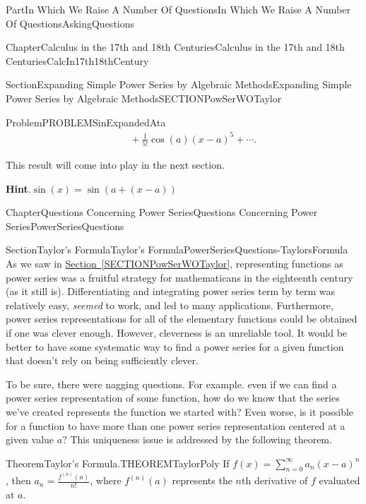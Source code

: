 \documentclass[oneside,10pt,]{book}
\newcommand{\blocktitlefont}{\relax}
\newcommand{\xreffont}{\relax}
\numberwithin{equation}{part}
\newcommand{\amp}{&}
\begin{document}
\begin{partptx}{Part}{In Which We Raise A Number Of Questions}{}{In Which We Raise A Number Of Questions}{}{}{AskingQuestions}
\begin{chapterptx}{Chapter}{Calculus in the 17th and 18th Centuries}{}{Calculus in the 17th and 18th Centuries}{}{}{CalcIn17th18thCentury}
\begin{sectionptx}{Section}{Expanding Simple Power Series by Algebraic Methods}{}{Expanding Simple Power Series by Algebraic Methods}{}{}{SECTIONPowSerWOTaylor}
\begin{problem}{Problem}{}{PROBLEMSinExpandedAta}
\begin{align*}
\amp{}\ \ \ \ \ +\frac{1}{5!}\cos
\left(a\right){\left(x-a\right)}^5+\cdots.
\end{align*}
%
\par
This result will come into play in the next section.%
\par\smallskip%
\noindent\textbf{\blocktitlefont Hint}.\hypertarget{PROBLEMSinExpandedAta-2}{}\quad{}\(\sin \left(x\right) =\sin \left(a+\left(x-a\right)\right)\)%
\end{problem}
\end{sectionptx}
\end{chapterptx}
%
%
\typeout{************************************************}
\typeout{************************************************}
%
\begin{chapterptx}{Chapter}{Questions Concerning Power Series}{}{Questions Concerning Power Series}{}{}{PowerSeriesQuestions}
\renewcommand*{\chaptername}{Chapter}
%
%
\typeout{************************************************}
\typeout{************************************************}
%
\begin{sectionptx}{Section}{Taylor's Formula}{}{Taylor's Formula}{}{}{PowerSeriesQuestions-TaylorsFormula}
As we saw in \hyperref[SECTIONPowSerWOTaylor]{Section~{\xreffont\ref{SECTIONPowSerWOTaylor}}}, representing functions as power series was a fruitful strategy for mathematicans in the eighteenth century (as it still is). Differentiating and integrating power series term by term was relatively easy, \emph{seemed} to work, and led to many applications.  Furthermore, power series representations for all of the elementary functions could be obtained if one was clever enough. However, cleverness is an unreliable tool.  It would be better to have some systematic way to find a power series for a given function that doesn't rely on being sufficiently clever.%
\par
To be sure, there were nagging questions. For example. even if we can find a power series representation of some function, how do we know that the series we've created represents the function we started with?  Even worse, is it possible for a function to have more than one power series representation centered at a given value \(a?\) This uniqueness issue is addressed by the following theorem.%
\begin{theorem}{Theorem}{Taylor's Formula.}{}{THEOREMTaylorPoly}%
%
If \(f(x)=\sum_{n=0}^\infty a_n(x-a)^n\), then \(a_n=\frac{f^{(n)}(a)}{n!}\), where \(f^{(n)}(a)\) represents the \(n\)th derivative of \(f\) evaluated at \(a\).%

\end{theorem}
\end{sectionptx}
\end{chapterptx}
\end{partptx}
\end{document}
